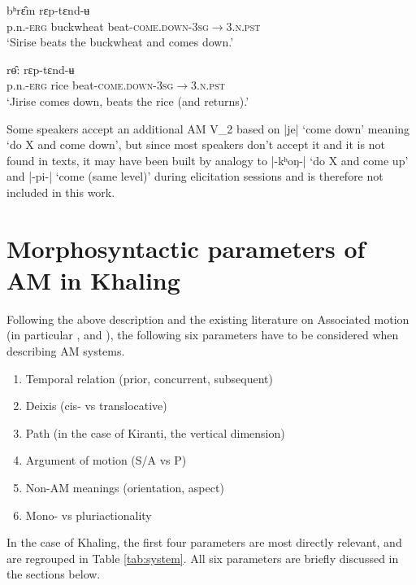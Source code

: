 \documentclass[oneside,a4paper,11pt]{article}
\newcommand{\ipa}[1]{{\phon#1}}
\newcommand{\dhatu}[2]{|\ipa{#1}| `#2'}
\begin{document}
 \begin{exe}
\ex \label{ex:ryaptyandyu1}
  \gll   \ipa{siriseʔ-ɛ} \ipa{bʰrɛ̂m}  \ipa{rɛp-tɛnd-ʉ} \\
   p.n.-\textsc{erg} buckwheat beat-\textsc{come.down}-\textsc{3sg$\rightarrow$3.n.pst} \\
\glt `Sirise beats the buckwheat and comes down.'
 \end{exe}

 \begin{exe}
\ex \label{ex:ryaptyandyu2}
 \gll   \ipa{dzirise-ʔɛ} \ipa{rɵ̂:} \ipa{rɛp-tɛnd-ʉ} \\
 p.n.-\textsc{erg} rice beat-\textsc{come.down}-\textsc{3sg$\rightarrow$3.n.pst} \\
\glt `Jirise comes down, beats the rice (and returns).'
 \end{exe}
 
Some speakers accept an additional AM V_2 based on \dhatu{je}{come down} meaning `do X and come down', but since most speakers don't accept it and it is not found in texts, it may have been built by analogy to  \dhatu{-kʰoŋ-}{do X and come up} and \dhatu{-pi-}{come (same level)} during elicitation sessions and is therefore not included in this work.
 
\section{Morphosyntactic parameters of AM in Khaling}
Following the above description and the existing literature on Associated motion (in particular \citealt{koch84associated.motion}, \citealt{wilkins91associated.motion} and \citealt{guillaume16am}), the following six parameters have to be considered when describing AM systems. 

\begin{enumerate}
\item Temporal relation (prior, concurrent, subsequent)
\item Deixis (cis- vs translocative)
\item Path (in the case of Kiranti, the vertical dimension)
\item Argument of motion (S/A vs P)
\item Non-AM meanings (orientation, aspect)
\item Mono- vs pluriactionality
\end{enumerate}
 

In the case of Khaling, the first four parameters are most directly relevant, and are regrouped in Table \ref{tab:system}.  All six parameters are briefly discussed in the sections below.
\end{document}
